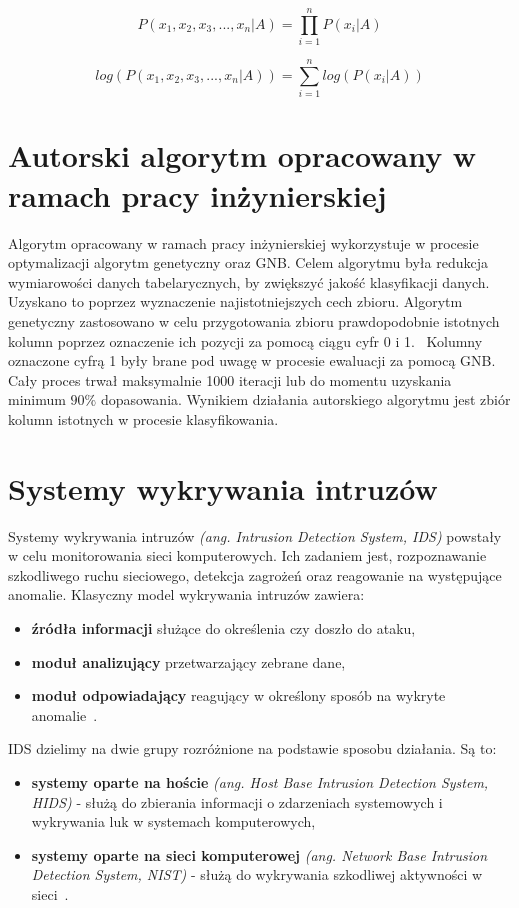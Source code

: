 \begin{equation}\label{math:gnb2}
P(x_1,x_2,x_3,...,x_n|A) = \prod_{i=1}^{n}P(x_i|A)
\end{equation}

\begin{equation}\label{math:gnb3}
log(P(x_1,x_2,x_3,...,x_n|A)) = \sum_{i=1}^{n}log(P(x_i|A))
\end{equation}


\section{Autorski algorytm opracowany w ramach pracy inżynierskiej}
Algorytm opracowany w ramach pracy inżynierskiej wykorzystuje w procesie optymalizacji algorytm genetyczny oraz GNB. Celem algorytmu była redukcja wymiarowości danych tabelarycznych, by zwiększyć jakość klasyfikacji danych. Uzyskano to poprzez wyznaczenie najistotniejszych cech zbioru. Algorytm genetyczny zastosowano w celu przygotowania zbioru prawdopodobnie istotnych kolumn poprzez oznaczenie ich pozycji za pomocą ciągu cyfr 0 i 1.  \ Kolumny oznaczone cyfrą 1 były brane pod uwagę w procesie ewaluacji za pomocą GNB. Cały proces trwał maksymalnie 1000 iteracji lub do momentu uzyskania minimum $90\%$ dopasowania. Wynikiem działania autorskiego algorytmu jest zbiór kolumn istotnych w procesie klasyfikowania.

\section{Systemy wykrywania intruzów}
Systemy wykrywania intruzów \textit{(ang. Intrusion Detection System, IDS)} powstały w celu monitorowania sieci komputerowych. Ich zadaniem jest, rozpoznawanie szkodliwego ruchu sieciowego, detekcja zagrożeń oraz reagowanie na występujące anomalie. Klasyczny model wykrywania intruzów zawiera:
\begin{itemize}
\item \textbf{źródła informacji} służące do określenia czy doszło do ataku,
\item \textbf{moduł analizujący} przetwarzający zebrane dane,
\item \textbf{moduł odpowiadający} reagujący w określony sposób na wykryte anomalie~\cite{SazzadulHoque2012, Bacer, Blyszcz2022}.
\end{itemize}
IDS dzielimy na dwie grupy rozróżnione na podstawie sposobu działania. Są to:
\begin{itemize}
    \item \textbf{systemy oparte na hoście} \textit{(ang. Host Base Intrusion Detection System, HIDS)} - służą do zbierania informacji o zdarzeniach systemowych i wykrywania luk w systemach komputerowych,
    \item \textbf{systemy oparte na sieci komputerowej} \textit{(ang. Network Base Intrusion Detection System, NIST)} - służą do wykrywania szkodliwej aktywności w sieci~\cite{Blyszcz2022, SazzadulHoque2012, chawlaashima}.
\end{itemize}


